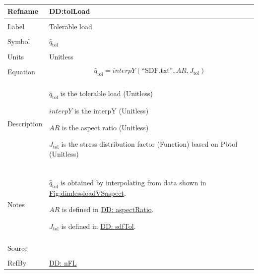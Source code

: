 \documentclass[12pt]{article}
\begin{document}
\begin{minipage}{\textwidth}
\begin{tabular}{>{\raggedright}p{}>{\raggedright\arraybackslash}p{}}
\toprule \textbf{Refname} & \textbf{DD:tolLoad}
\label{DD:tolLoad}
\\ \midrule \\
Label & Tolerable load
        
\\ \midrule \\
Symbol & ${\hat{q}_{\text{tol}}}$
         
\\ \midrule \\
Units & Unitless
        
\\ \midrule \\
Equation & \begin{displaymath}
           {\hat{q}_{\text{tol}}}=interpY\left(\text{``SDF.txt''},AR,{J_{\text{tol}}}\right)
           \end{displaymath}
\\ \midrule \\
Description & \begin{symbDescription}
              \item{${\hat{q}_{\text{tol}}}$ is the tolerable load (Unitless)}
              \item{$interpY$ is the interpY (Unitless)}
              \item{$AR$ is the aspect ratio (Unitless)}
              \item{${J_{\text{tol}}}$ is the stress distribution factor (Function) based on Pbtol (Unitless)}
              \end{symbDescription}
\\ \midrule \\
Notes & ${\hat{q}_{\text{tol}}}$ is obtained by interpolating from data shown in \hyperref[Figure:dimlessloadVSaspect]{Fig:dimlessloadVSaspect}.
        
        $AR$ is defined in \hyperref[DD:aspectRatio]{DD: aspectRatio}.
        
        ${J_{\text{tol}}}$ is defined in \hyperref[DD:sdfTol]{DD: sdfTol}.
        
\\ \midrule \\
Source & \cite{astm2009}
         
\\ \midrule \\
RefBy & \hyperref[DD:nFL]{DD: nFL}
        
\\ \bottomrule
\end{tabular}
\end{minipage}
\end{document}
